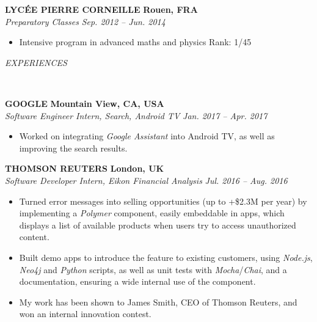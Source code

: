 \documentclass[a4paper, 12pt]{article}
\newcommand{\marginline}{-0.3cm}
\newcommand{\margincontent}{-0.6cm}
\newcommand{\marginbeforesection}{0.3cm}
\newcommand{\linewidthperso}{0.02cm}
\newcommand{\stylesection}[1]{
  \vspace{\marginbeforesection}
  \begin{normalsize}\textit{#1}\end{normalsize}
  \vspace{\marginline}\\
  \noindent\makebox[\linewidth]{\rule{\textwidth}{\linewidthperso}}

}
\newcommand{\styletitle}[1]{\textbf{#1}}
\newcommand{\styledesc}[1]{\textit{#1}}
\newcommand{\styleloc}[1]{\textbf{#1}}
\newcommand{\styledates}[1]{\textit{#1}}
\begin{document}
\begin{footnotesize}
\styletitle{LYC\'EE PIERRE CORNEILLE} \hfill \styleloc{Rouen, FRA}\\
\styledesc{Preparatory Classes} \hfill \styledates{Sep. 2012 -- Jun. 2014}\\
\vspace{\margincontent}
\begin{itemize}
  \item Intensive program in advanced maths and physics \hfill Rank: 1/45
\end{itemize}

\stylesection{EXPERIENCES}

\styletitle{GOOGLE} \hfill \styleloc{Mountain View, CA, USA}\\ 
\styledesc{Software Engineer Intern, Search, Android TV} \hfill \styledates{Jan. 2017 -- Apr. 2017}\\
\vspace{\margincontent}
\begin{itemize}
  \item Worked on integrating \textit{Google Assistant} into Android TV, as well as improving the search results.
\end{itemize}

\styletitle{THOMSON REUTERS} \hfill \styleloc{London, UK}\\ 
\styledesc{Software Developer Intern, Eikon Financial Analysis} \hfill \styledates{Jul. 2016 -- Aug. 2016}\\
\vspace{\margincontent}
\begin{itemize}
  \item Turned error messages into selling opportunities (up to +\$2.3M per year) by implementing a \textit{Polymer} component, easily embeddable in apps, which displays a list of available products when users try to access unauthorized content.
  \item Built demo apps to introduce the feature to existing customers, using \textit{Node.js}, \textit{Neo4j} and \textit{Python} scripts, as well as unit tests with \textit{Mocha}/\textit{Chai}, and a documentation, ensuring a wide internal use of the component.
  \item My work has been shown to James Smith, CEO of Thomson Reuters, and won an internal innovation contest.
\end{itemize}


\end{footnotesize}
\end{document}
